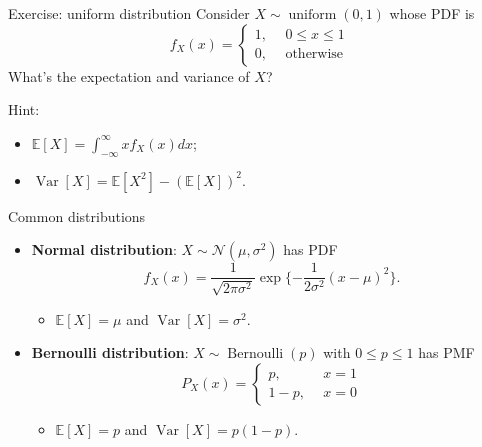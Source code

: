 \documentclass[10pt]{beamer}
\newcommand{\expect}{\mathbb{E}}
\newcommand{\var}{\operatorname{Var}}
\begin{document}
\begin{frame}{Exercise: uniform distribution}
    Consider $X \sim \operatorname{uniform}(0, 1)$ whose PDF is 
   \begin{equation*}
        f_X(x)=\left\{
        \begin{aligned}
        1, &~~ 0 \le x \le 1\\
        0, &~~ \text{otherwise}
        \end{aligned}
        \right.
    \end{equation*}
    What's the expectation and variance of $X$?
    
    Hint:
    \begin{itemize}
        \item $\expect[X] = \int_{-\infty}^\infty xf_X(x)dx$;
        \item $\var[X] = \expect[X^2] - (\expect[X])^2$.
    \end{itemize}
\end{frame}

\begin{frame}{Common distributions}
    \begin{itemize}
        \item \textbf{Normal distribution}: $X \sim \mathcal{N}(\mu, \sigma^2)$ has PDF
        \[
            f_X(x) = \frac{1}{\sqrt{2\pi\sigma^2}}\exp\{-\frac{1}{2\sigma^2}(x - \mu)^2\}.
        \]
        \begin{itemize}
            \item $\expect[X] = \mu$ and $\var[X] = \sigma^2$. 
        \end{itemize}
        \item \textbf{Bernoulli distribution}: $X \sim \operatorname{Bernoulli}(p)$ with $0 \le p \le 1$ has PMF
        \begin{equation*}
        P_X(x)=\left\{
        \begin{aligned}
        p, &~~ x = 1 \\
        1-p, &~~ x = 0 
        \end{aligned}
        \right.
        \end{equation*}
        \begin{itemize}
            \item $\expect[X] = p$ and $\var[X] = p(1 - p)$. 
        \end{itemize}
    \end{itemize}
\end{frame}
\end{document}
